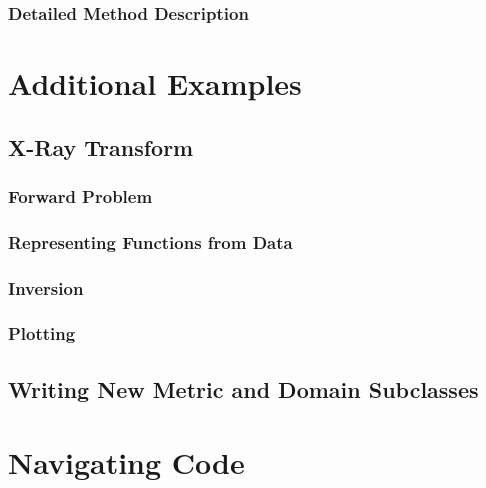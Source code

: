 \documentclass[10pt]{article}
\begin{document}
		\subsubsection{Detailed Method Description}
		

\newpage
\section{Additional Examples}

	\subsection{X-Ray Transform}
		\subsubsection{Forward Problem}
		\subsubsection{Representing Functions from Data}
		\subsubsection{Inversion}
		\subsubsection{Plotting}
		

		
	\subsection{Writing New Metric and Domain Subclasses}



\newpage
\section{Navigating Code}
\end{document}
